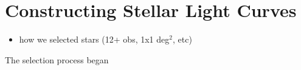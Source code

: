 \documentclass[aps,prb,twocolumn,superscriptaddress]{revtex4-1}
\begin{document}

\section{Constructing Stellar Light Curves}


\begin{itemize}
	\item{} how we selected stars (12+ obs, 1x1 deg$^2$, etc)
\end{itemize}

The selection process began


\end{document}
